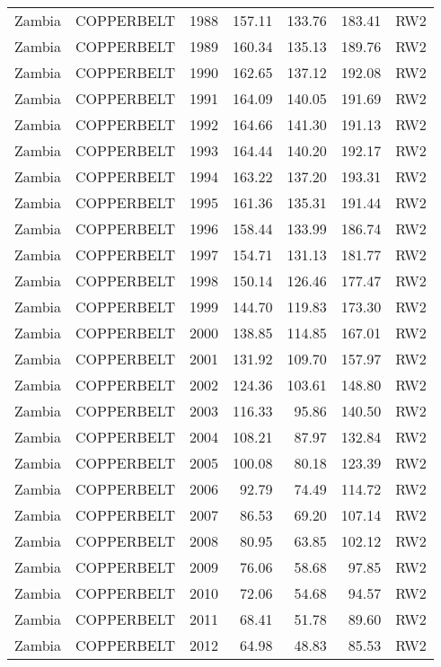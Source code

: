 \begin{longtable}{lllrrrl}
  Zambia & COPPERBELT & 1988 & 157.11 & 133.76 & 183.41 & RW2 \\ 
  Zambia & COPPERBELT & 1989 & 160.34 & 135.13 & 189.76 & RW2 \\ 
  Zambia & COPPERBELT & 1990 & 162.65 & 137.12 & 192.08 & RW2 \\ 
  Zambia & COPPERBELT & 1991 & 164.09 & 140.05 & 191.69 & RW2 \\ 
  Zambia & COPPERBELT & 1992 & 164.66 & 141.30 & 191.13 & RW2 \\ 
  Zambia & COPPERBELT & 1993 & 164.44 & 140.20 & 192.17 & RW2 \\ 
  Zambia & COPPERBELT & 1994 & 163.22 & 137.20 & 193.31 & RW2 \\ 
  Zambia & COPPERBELT & 1995 & 161.36 & 135.31 & 191.44 & RW2 \\ 
  Zambia & COPPERBELT & 1996 & 158.44 & 133.99 & 186.74 & RW2 \\ 
  Zambia & COPPERBELT & 1997 & 154.71 & 131.13 & 181.77 & RW2 \\ 
  Zambia & COPPERBELT & 1998 & 150.14 & 126.46 & 177.47 & RW2 \\ 
  Zambia & COPPERBELT & 1999 & 144.70 & 119.83 & 173.30 & RW2 \\ 
  Zambia & COPPERBELT & 2000 & 138.85 & 114.85 & 167.01 & RW2 \\ 
  Zambia & COPPERBELT & 2001 & 131.92 & 109.70 & 157.97 & RW2 \\ 
  Zambia & COPPERBELT & 2002 & 124.36 & 103.61 & 148.80 & RW2 \\ 
  Zambia & COPPERBELT & 2003 & 116.33 & 95.86 & 140.50 & RW2 \\ 
  Zambia & COPPERBELT & 2004 & 108.21 & 87.97 & 132.84 & RW2 \\ 
  Zambia & COPPERBELT & 2005 & 100.08 & 80.18 & 123.39 & RW2 \\ 
  Zambia & COPPERBELT & 2006 & 92.79 & 74.49 & 114.72 & RW2 \\ 
  Zambia & COPPERBELT & 2007 & 86.53 & 69.20 & 107.14 & RW2 \\ 
  Zambia & COPPERBELT & 2008 & 80.95 & 63.85 & 102.12 & RW2 \\ 
  Zambia & COPPERBELT & 2009 & 76.06 & 58.68 & 97.85 & RW2 \\ 
  Zambia & COPPERBELT & 2010 & 72.06 & 54.68 & 94.57 & RW2 \\ 
  Zambia & COPPERBELT & 2011 & 68.41 & 51.78 & 89.60 & RW2 \\ 
  Zambia & COPPERBELT & 2012 & 64.98 & 48.83 & 85.53 & RW2 \\ 

\end{longtable}
